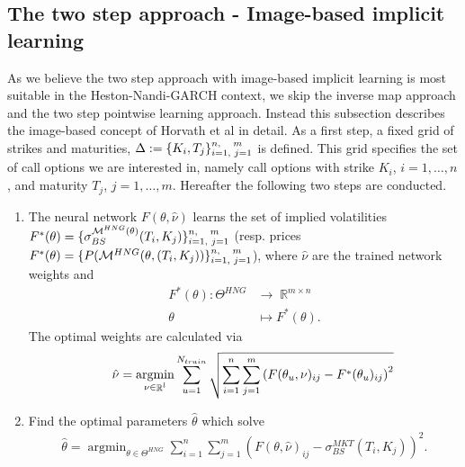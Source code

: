 \documentclass{article}
\DeclareMathOperator{\R}{\mathbb{R}}
\DeclareMathOperator*{\argmin}{argmin}
\begin{document}
\subsection{The two step approach - Image-based implicit learning}
As we believe the two step approach with image-based implicit learning is most suitable in the Heston-Nandi-GARCH context, we skip the inverse map approach and the two step pointwise learning approach. Instead this subsection describes the image-based concept of Horvath et al \cite{Blanka} in detail. \newline
As a first step, a fixed grid of strikes and maturities, $\Delta := \{K_i, T_j\}_{i=1,\hspace{.1cm} j=1}^{n,\hspace{.35cm}m}$ is defined. This grid specifies the set of call options we are interested in, namely call options with strike $K_i$, $i=1,\ldots,n$, and maturity $T_j$, $j=1,\ldots,m$. Hereafter the following two steps are conducted.
\begin{enumerate}
    \item The neural network $F(\theta, \hat{\nu})$ learns the set of implied volatilities  $F^*(\theta) = \{\sigma_{BS}^{\mathcal{M}^{HNG}(\theta)}(T_i,K_j)\}_{i=1,\hspace{.1cm} j=1}^{n,\hspace{.35cm}m}$ (resp. prices $F^*(\theta) = \{P(\mathcal{M}^{HNG}(\theta, (T_i, K_j))\}_{i=1,\hspace{.1cm} j=1}^{n,\hspace{.35cm}m}$), where $\hat{\nu}$ are the trained network weights and 
    \begin{align*}
        F^*(\theta): \Theta^{HNG} &\to \R^{m \times n} \\
        \theta &\mapsto F^*(\theta).
    \end{align*}
    The optimal weights are calculated via 
    \begin{align*}
       \hspace{0.5cm} \hat{\nu} = \argmin_{\nu \in \R^l} \sum_{u=1}^{N_{train}}\sqrt{\sum_{i=1}^n\sum_{j=1}^{m}\left(F(\theta_u, \nu)_{ij} - F^*(\theta_u)_{ij}\right)^2}
    \end{align*}
    \item Find the optimal parameters $\hat{\theta}$ which solve
    \begin{align*}
        \hat{\theta} = \argmin_{\theta \in \Theta^{HNG}} \sum_{i=1}^{n}\sum_{j=1}^{m}(F(\theta, \hat{\nu})_{ij}-\sigma_{BS}^{MKT}(T_i,K_j))^2.
    \end{align*}
\end{enumerate}
\end{document}
